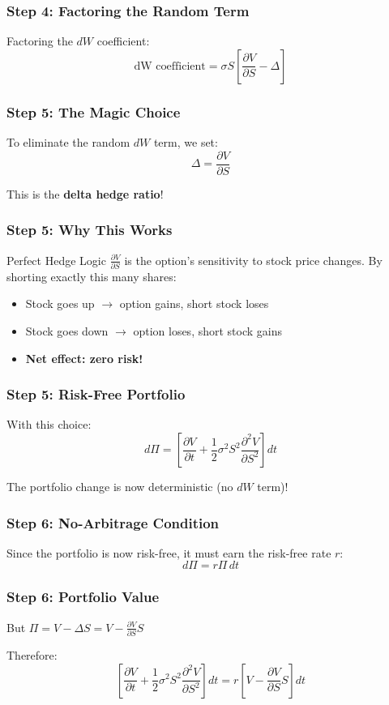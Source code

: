 \documentclass[aspectratio=169]{beamer}
\begin{document}
\begin{frame}
\frametitle{Step 4: Factoring the Random Term}
Factoring the \(dW\) coefficient:
\[\text{dW coefficient} = \sigma S\left[\frac{\partial V}{\partial S} - \Delta\right]\]
\end{frame}

\begin{frame}
\frametitle{Step 5: The Magic Choice}
To eliminate the random \(dW\) term, we set:
\[\Delta = \frac{\partial V}{\partial S}\]

This is the \textbf{delta hedge ratio}!
\end{frame}

\begin{frame}
\frametitle{Step 5: Why This Works}
\begin{block}{Perfect Hedge Logic}
\(\frac{\partial V}{\partial S}\) is the option's sensitivity to stock price changes. By shorting exactly this many shares:
\begin{itemize}
\item Stock goes up \(\rightarrow\) option gains, short stock loses
\item Stock goes down \(\rightarrow\) option loses, short stock gains
\item \textbf{Net effect: zero risk!}
\end{itemize}
\end{block}
\end{frame}

\begin{frame}
\frametitle{Step 5: Risk-Free Portfolio}
With this choice: 
\[d\Pi = \left[\frac{\partial V}{\partial t} + \frac{1}{2}\sigma^2 S^2 \frac{\partial^2 V}{\partial S^2}\right] dt\]

The portfolio change is now deterministic (no \(dW\) term)!
\end{frame}

\begin{frame}
\frametitle{Step 6: No-Arbitrage Condition}
Since the portfolio is now risk-free, it must earn the risk-free rate \(r\):
\[d\Pi = r\Pi \, dt\]
\end{frame}

\begin{frame}
\frametitle{Step 6: Portfolio Value}
But \(\Pi = V - \Delta S = V - \frac{\partial V}{\partial S}S\)

Therefore:
\[\left[\frac{\partial V}{\partial t} + \frac{1}{2}\sigma^2 S^2 \frac{\partial^2 V}{\partial S^2}\right] dt = r\left[V - \frac{\partial V}{\partial S}S\right] dt\]
\end{frame}
\end{document}
